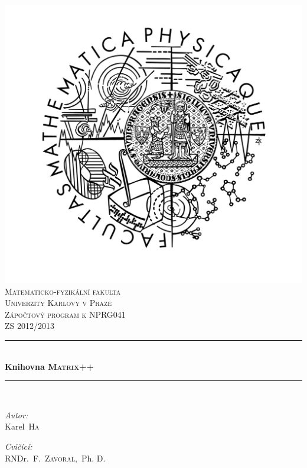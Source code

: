 \documentclass[11pt,a4paper]{article}
\newcommand{\HRule}{\rule{\linewidth}{0.5mm}}
\newcommand{\mpp}{\textsc{Matrix++}}
\theoremstyle{remark}
\begin{document}
\begin{titlepage}
\begin{center}
\includegraphics[viewport=180 50 100 100,scale=0.5]{./logo_mff.jpg}\\[1cm]    

\textsc{\LARGE Matematicko-fyzikální fakulta\\[0.1cm]
Univerzity Karlovy v Praze}\\[1.5cm]

\textsc{\Large Zápočtový program k NPRG041\\ ZS 2012/2013}\\[0.5cm]


\HRule \\[0.4cm]
{ \huge \bfseries Knihovna \mpp}\\[0.4cm]

\HRule \\[1.5cm]

\begin{minipage}{0.4\textwidth}
\begin{flushleft} \large
\emph{Autor:}\\
Karel~\textsc{Ha}
\end{flushleft}
\end{minipage}
\begin{minipage}{0.4\textwidth}
\begin{flushright} \large
\emph{Cvičící:} \\
RNDr.~F.~\textsc{Zavoral},~Ph. D.
\end{flushright}
\end{minipage}


\end{center}
\end{titlepage}
\end{document}
